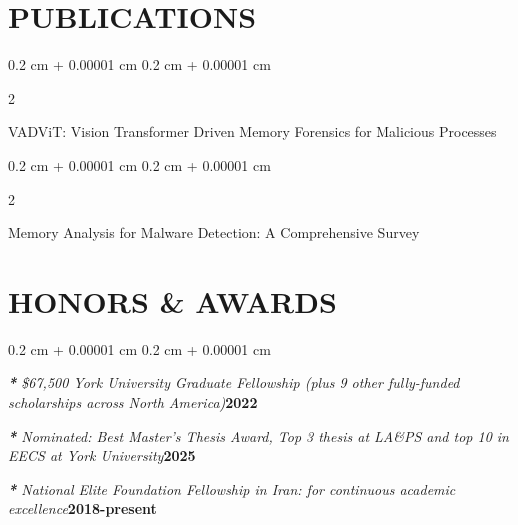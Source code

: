 \documentclass[11pt, letterpaper]{article}
\newenvironment{onecolentry}{
    \begin{adjustwidth}{
        0.2 cm + 0.00001 cm
    }{
        0.2 cm + 0.00001 cm
    }
}{
    \end{adjustwidth}
} %
\newenvironment{twocolentry}[2][]{
    \onecolentry
    \def\secondColumn{#2}
    \setcolumnwidth{\fill, 4.5 cm}
    \begin{paracol}{2}
}{
    \switchcolumn \raggedleft \secondColumn
    \end{paracol}
    \endonecolentry
} %
\let\hrefWithoutArrow\href
\renewcommand{\href}[2]{\hrefWithoutArrow{#1}{\ifthenelse{\equal{#2}{}}{ }{#2}}}
\begin{document}
    \vspace{-0.1cm}
    \section {PUBLICATIONS}
        \vspace{0.1cm}
        \begin{twocolentry}{
        \href{https://doi.org/10.1016/j.jisa.2025.104200}{DOI}
        }
            VADViT: Vision Transformer Driven Memory Forensics for Malicious Processes
        \end{twocolentry}

        \begin{twocolentry}{
            \href{https://doi.org/10.1145/3764580}{DOI}
        }
            Memory Analysis for Malware Detection: A Comprehensive Survey
        \end{twocolentry}


    \vspace{-0.1cm}
    \section{HONORS \& AWARDS}
    \vspace{0.05cm}
        \begin{onecolentry}

            \textit{\textbf{*} \$67,500 York University Graduate Fellowship (plus 9 other fully-funded scholarships across North America)}\hfill\textbf{2022}

            \textit{\textbf{*} Nominated: Best Master's Thesis Award, Top 3 thesis at LA\&PS and top 10 in EECS at York University}\hfill\textbf{2025}

            \textit{\textbf{*} National Elite Foundation Fellowship in Iran: for continuous academic excellence}\hfill\textbf{2018-present}


        \end{onecolentry}
\end{document}
